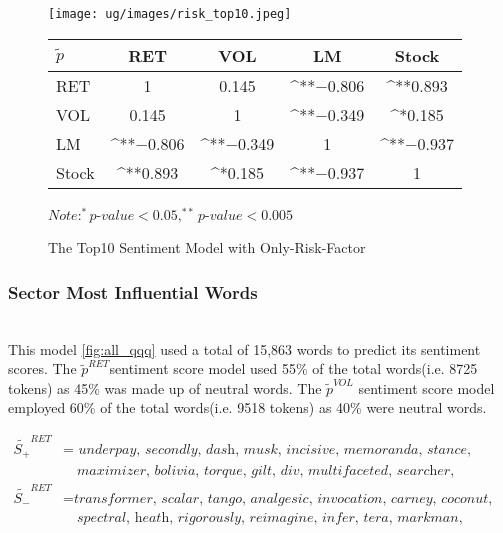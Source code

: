 \documentclass[logo,bsc,singlespacing,parskip]{infthesis}
\begin{document}
\begin{figure}[p]
\centering
\begin{minipage}{0.90\textwidth}
    \centering
    \texttt{[image: ug/images/risk\_top10.jpeg]}
    \caption{The Top10 Sentiment Model with Only-Risk-Factor}
    \label{fig:risk_top10}
\end{minipage}%
\hfill
\vspace{30pt} %
\begin{minipage}{0.9\textwidth}

    \begin{minipage}[p]{0.9\textwidth}
    \centering
    \begin{tabular}{lcccc}
    \label{tab:risk_top10_corr}
    $\tilde{p}$      & RET       & VOL       & LM        & Stock    \\ \hline
    RET    & 1  & 0.145  & ^{**}$-$0.806 & ^{**}0.893 \\
    VOL    & 0.145   & 1  & ^{**}$-$0.349 & ^{*}0.185  \\
    LM    & ^{**}$-$0.806 & ^{**}$-$0.349 & 1  & ^{**}$-$0.937 \\
    Stock  & ^{**}0.893 & ^{*}0.185  & ^{**}$-$0.937 & 1  \\ \hline
    \end{tabular}
    \medskip
    $\textit{Note}: ^{*}p$-$value<0.05, ^{**}p$-$value<0.005$
    \end{minipage}

\end{minipage}
\end{figure}

\subsubsection{Sector Most Influential Words}

\label{word_all_qqq}
\\
This model \ref{fig:all_qqq} used a total of 15,863 words to predict its sentiment scores. The $\tilde{p}^{RET}$sentiment score model used 55\% of the total words(i.e. 8725 tokens) as 45\% was made up of neutral words. The $\tilde{p}^{VOL}$ sentiment score model employed 60\% of the total words(i.e. 9518 tokens) as 40\% were neutral words. 

\begin{align*}
\tilde{S_{+}}^{RET} &= \textit{ underpay, secondly, dash, musk, incisive, memoranda, stance,} \\
               &\quad \textit{maximizer, bolivia, torque, gilt, div, multifaceted, searcher, formulaic} \\
\tilde{S_{-}}^{RET} &= \textit{transformer, scalar, tango, analgesic, invocation, carney, coconut,} \\
               &\quad \textit{spectral, heath, rigorously, reimagine, infer, tera, markman, enclosure}
\end{align*}
\end{document}
